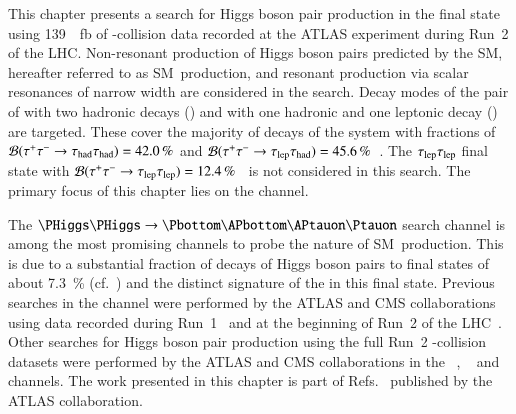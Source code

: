 This chapter presents a search for Higgs boson pair production in the \bbtautau
final state using \SI{139}{\per\femto\barn} of \pp-collision data recorded at
the ATLAS experiment during Run~2 of the LHC. Non-resonant production of Higgs
boson pairs predicted by the SM, hereafter referred to as SM~\HH production, and
resonant production via scalar resonances of narrow width are considered in the
search. Decay modes of the pair of \tauleptons with two hadronic \taulepton
decays (\hadhad) and with one hadronic and one leptonic \taulepton decay
(\lephad) are targeted. These cover the majority of decays of the \tautau system
with fractions of $\mathcal{B}(\tau^{+} \tau^{-} \to \tau_{\text{had}}\tau_{\text{had}}) = \SI{42.0}{\percent}$ and
$\mathcal{B}(\tau^{+} \tau^{-} \to \tau_{\text{lep}}\tau_{\text{had}}) =
\SI{45.6}{\percent}$~\cite{Zyla:2020zbs}. The $\tau_{\text{lep}}\tau_{\text{lep}}$ final state with
$\mathcal{B}(\tau^{+} \tau^{-} \to \tau_{\text{lep}}\tau_{\text{lep}}) =
\SI{12.4}{\percent}$~\cite{Zyla:2020zbs} is not considered in this search. The
primary focus of this chapter lies on the \hadhad channel.

The $\HH \to \bbtautau$ search channel is among the most promising channels to
probe the nature of SM~\HH production. This is due to a substantial fraction of
decays of Higgs boson pairs to \bbtautau final states of about
\SI{7.3}{\percent} (cf.~) and the distinct
signature of the \tauleptons in this final state. Previous searches in the
\bbtautau channel were performed by the ATLAS and CMS collaborations using data
recorded during Run~1~\cite{HIGG-2013-33,CMS-HIG-15-013} and at the beginning of
Run~2 of the LHC~\cite{HIGG-2016-16-witherratum,CMS-HIG-17-002}.  Other searches
for Higgs boson pair production using the full Run~2 \pp-collision datasets were
performed by the ATLAS and CMS collaborations in the
\bbtautau~\cite{CMS-PAS-HIG-20-010},
\bbbb~\cite{ATLAS-CONF-2022-035,CMS-HIG-20-005} and
\bbyy~\cite{HDBS-2018-34,CMS-HIG-19-018} channels.
The work presented in this chapter is part of
Refs.~\cite{ATLAS-CONF-2021-030,HDBS-2018-40} published by the ATLAS
collaboration.

